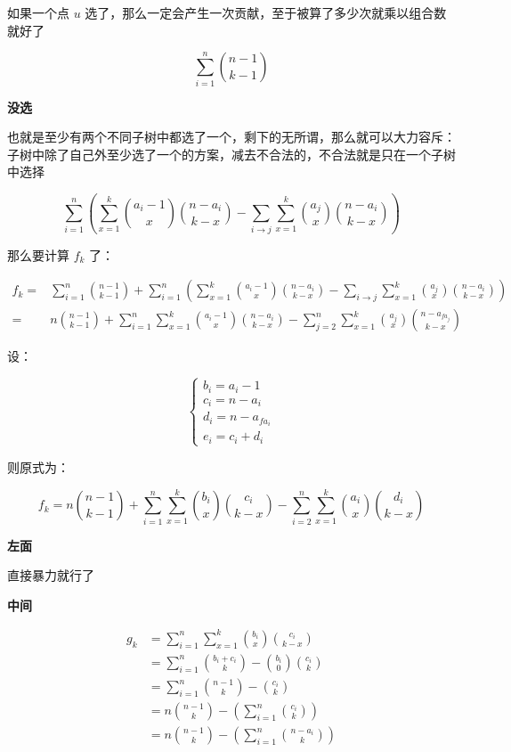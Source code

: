 \documentclass[UTF8]{article}
\begin{document}
如果一个点 $u$ 选了，那么一定会产生一次贡献，至于被算了多少次就乘以组合数就好了

$$
\sum_{i=1}^{n}{n-1 \choose k-1}
$$

\textbf{没选}

也就是至少有两个不同子树中都选了一个，剩下的无所谓，那么就可以大力容斥：子树中除了自己外至少选了一个的方案，减去不合法的，不合法就是只在一个子树中选择

$$
\sum_{i=1}^{n} \left(\sum_{x=1}^{k} {a_i-1 \choose x}{n-a_i \choose k-x}-\sum_{i \to j} \sum_{x=1}^{k}{a_j \choose x}{n-a_i \choose k-x} \right)
$$

那么要计算 $f_k$ 了：

$$
\begin{aligned}
f_k
=&\sum_{i=1}^{n}{n-1 \choose k-1}+\sum_{i=1}^{n} \left(\sum_{x=1}^{k} {a_i-1 \choose x}{n-a_i \choose k-x}-\sum_{i \to j} \sum_{x=1}^{k}{a_j \choose x}{n-a_i \choose k-x} \right) \\
=& n{n-1 \choose k-1}
   +\sum_{i=1}^{n}\sum_{x=1}^{k} {a_i-1 \choose x}{n-a_i \choose k-x}
   -\sum_{j=2}^{n}\sum_{x=1}^{k}{a_j \choose x}{n-a_{fa_j} \choose k-x}
\end{aligned}
$$

设：

$$
\begin{cases}
b_i=a_i-1 \\
c_i=n-a_i \\
d_i=n-a_{fa_i} \\
e_i=c_i+d_i
\end{cases}
$$

则原式为：

$$
f_k=n {n-1 \choose k-1}+\sum_{i=1}^{n}\sum_{x=1}^{k} {b_i \choose x} {c_i \choose k-x}-\sum_{i=2}^{n}\sum_{x=1}^{k}{a_i \choose x}{d_i \choose k-x}
$$

\textbf{左面}

直接暴力就行了

\textbf{中间}

$$
\begin{aligned}
g_k
&=\sum_{i=1}^{n}\sum_{x=1}^{k}{b_i \choose x}{c_i \choose k-x} \\
&=\sum_{i=1}^{n}{b_i+c_i \choose k}-{b_i \choose 0} {c_i \choose k} \\
&=\sum_{i=1}^{n}{n-1 \choose k}-{c_i \choose k} \\
&=n{n-1 \choose k}-\left(\sum_{i=1}^{n} {c_i \choose k}\right) \\
&=n{n-1 \choose k}-\left(\sum_{i=1}^{n} {n-a_i \choose k}\right) \\
\end{aligned}
$$
\end{document}
